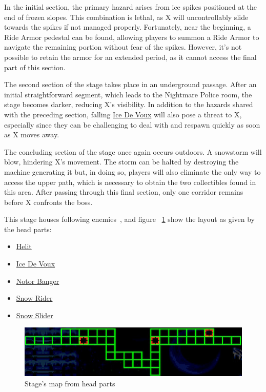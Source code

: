 In the initial section, the primary hazard arises from ice spikes positioned at the end of frozen slopes. This combination is lethal, as X will uncontrollably slide towards the spikes if not managed properly. Fortunately, near the beginning, a Ride Armor pedestal can be found, allowing players to summon a Ride Armor to navigate the remaining portion without fear of the spikes. However, it's not possible to retain the armor for an extended period, as it cannot access the final part of this section.

The second section of the stage takes place in an underground passage. After an initial straightforward segment, which leads to the Nightmare Police room, the stage becomes darker, reducing X's visibility. In addition to the hazards shared with the preceding section, falling \hyperlink{enem:Ice_De_Voux}{Ice De Voux}  will also pose a threat to X, especially since they can be challenging to deal with and respawn quickly as soon as X moves away.

The concluding section of the stage once again occurs outdoors. A snowstorm will blow, hindering X's movement. The storm can be halted by destroying the machine generating it but,  in doing so, players will also eliminate the only way to access the upper path, which is necessary to obtain the two collectibles found in this area. After passing through this final section, only one corridor remains before X confronts the boss.

This stage houses following enemies~\cite{wiki:Frozen_Town}, and figure ~\ref{fig:Frozen_town_map} show the layout as given by the head parts:
\begin{itemize}
	\item \hyperlink{enem:Helit}{Helit}
	\item \hyperlink{enem:Ice_De_Voux}{Ice De Voux} 
	\item \hyperlink{enem:Notor_Banger}{Notor Banger} 
	\item \hyperlink{enem:Snow_Rider}{Snow Rider} 
	\item \hyperlink{enem:Snow_Slider}{Snow Slider}
\end{itemize}

\begin{figure}[htp]
	\centering
	\includegraphics[width=.7\linewidth]{figures/X3/Blizzard_buffalo/Map.jpg}
	\caption{Stage's map from head parts}
	\label{fig:Frozen_town_map}
\end{figure}

